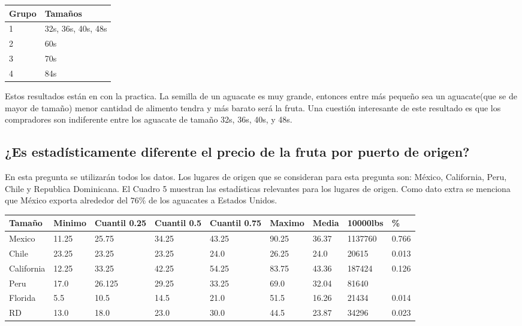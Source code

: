 \documentclass{article}
\begin{document}
\begin{center}
	\begin{tabular}{|l|l|}
	\hline
		Grupo & Tamaños\\ \hline
		1 & 32s, 36s, 40s, 48s  \\ \hline
		2 & 60s \\ \hline
		3 & 70s \\ \hline
		4 & 84s \\ \hline
	\end{tabular}
\end{center}	
Estos resultados están en con la practica. La semilla de un aguacate es muy grande, entonces entre más pequeño sea un aguacate(que se de mayor de tamaño) menor cantidad de alimento tendra y  más barato será la fruta. Una cuestión interesante de este resultado es que los compradores son indiferente entre los aguacate de tamaño 32s, 36s, 40s, y 48s.

\subsection*{¿Es estadísticamente diferente el precio de la fruta por puerto de origen?}
En esta pregunta se utilizarán todos los datos. Los lugares de origen que se consideran para esta pregunta son: México, California, Peru, Chile y Republica Dominicana. El Cuadro 5 muestran las estadísticas relevantes para los lugares de origen. Como dato extra se menciona que México exporta alrededor del $76\%$ de los aguacates a Estados Unidos.
\begin{center}
\begin{tabular}{|l|l|l|l|l|l|l|l|l|}
\hline
		Tamaño & Minimo & Cuantil 0.25 & Cuantil 0.5 & Cuantil 0.75 & Maximo & Media & 10000lbs & \% \\ \hline
 Mexico& 11.25 & 25.75 & 34.25 & 43.25 & 90.25 & 36.37 & 1137760 & 0.766  \\ \hline
 Chile& 23.25 & 23.25 & 23.25 & 24.0 & 26.25 & 24.0 & 20615 & 0.013\\ \hline
 California & 12.25 & 33.25 & 42.25 & 54.25 & 83.75 & 43.36 & 187424 &0.126\\ \hline
Peru & 17.0 & 26.125 & 29.25 & 33.25 & 69.0 & 32.04 & 81640 & \\ \hline
 Florida & 5.5 & 10.5 & 14.5 & 21.0 & 51.5 & 16.26 &21434 & 0.014\\ \hline
 RD & 13.0 & 18.0 & 23.0 & 30.0 & 44.5 & 23.87& 34296&0.023\\ \hline
\end{tabular}
\end{center}
\end{document}
